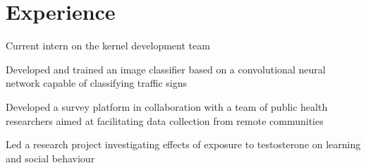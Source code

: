 \documentclass[]{chowes-resume}
\begin{document}
\begin{minipage}[t]{0.66\textwidth} 


\section{Experience}

\vspace{\topsep} %
\begin{tightemize}
\item Current intern on the kernel development team
\end{tightemize}
\sectionsep

\begin{tightemize}
\item Developed and trained an image classifier based on a convolutional neural network capable of classifying traffic signs
\end{tightemize}
\sectionsep

\begin{tightemize}
\item Developed a survey platform in collaboration with a team of public health researchers aimed at facilitating data collection from remote communities

\end{tightemize}
\sectionsep

\begin{tightemize}
\item Led a research project investigating effects of exposure to testosterone on learning and social behaviour
\end{tightemize}
\sectionsep


\end{minipage}
\end{document}
